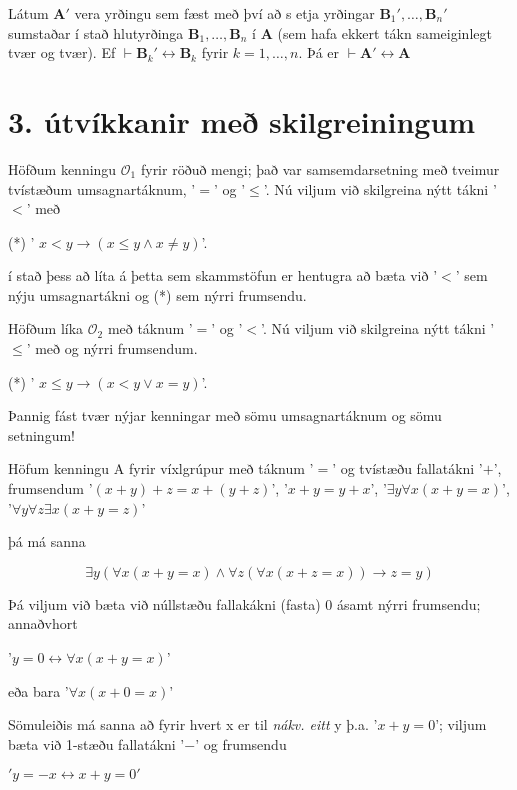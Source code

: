 \documentclass[12pt]{article}
\begin{document}
\begin{setn}[Jafngildisetning]
 Látum $ \mathbf{A}'$ vera yrðingu sem fæst með því að s etja yrðingar
 $\mathbf{B}_1', \dotsc, \mathbf{B}_n'$ sumstaðar í stað hlutyrðinga
 $\mathbf{B}_1, \dotsc, \mathbf{B}_n$ í $\mathbf{A}$ (sem hafa ekkert tákn
sameiginlegt tvær og tvær).
Ef $\vdash \mathbf{B}_k' \leftrightarrow \mathbf{B}_k$ fyrir
$k = 1, \dotsc, n$. Þá er $\vdash \mathbf{A}' \leftrightarrow \mathbf{A}$
\end{setn}


\section{3. útvíkkanir með skilgreiningum}

Höfðum kenningu $\mathcal{O}_1$ fyrir röðuð mengi;
það var samsemdarsetning með tveimur tvístæðum umsagnartáknum,
'$=$' og '$\leq$'. Nú viljum við skilgreina nýtt tákni '$<$' með

(*) ' $ x < y \rightarrow (x \leq y \wedge x \neq y)$'.

í stað þess að líta á þetta sem skammstöfun er hentugra að bæta við
'$<$' sem nýju umsagnartákni og (*) sem nýrri frumsendu.

Höfðum líka $\mathcal{O}_2$ með táknum
'$=$' og '$<$'. Nú viljum við skilgreina nýtt tákni '$\leq$' með
og nýrri frumsendum.

(*) ' $ x \leq y \rightarrow (x < y \vee x = y)$'.

Þannig fást tvær nýjar kenningar með sömu umsagnartáknum og sömu setningum!

Höfum kenningu A fyrir víxlgrúpur með táknum '$=$' og tvístæðu fallatákni '$+$',
frumsendum
'$(x+y) + z = x + (y + z)$', '$x + y = y + x$',
'$ \exists y \forall x (x +y = x) $', '$\forall y \forall z \exists x (x + y = z)$'

þá má sanna

\[ \exists y ( \forall x (x+y = x) \wedge \forall z (\forall x (x+z = x)) \rightarrow z = y) \]

Þá viljum við bæta við núllstæðu fallakákni (fasta) 0 ásamt nýrri frumsendu;
annaðvhort

'$y = 0 \leftrightarrow \forall x ( x+y = x)$'

eða bara
'$\forall x (x + 0 = x)$'

Sömuleiðis má sanna að fyrir hvert x er til \emph{nákv. eitt} y þ.a.
'$x+y = 0$'; viljum bæta við 1-stæðu fallatákni '$-$' og frumsendu

$'y = -x \leftrightarrow x + y = 0'$
\end{document}
